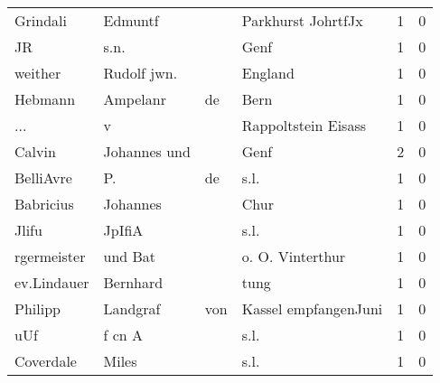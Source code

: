 \documentclass[10pt,a4paper,landscape]{article}
\begin{document}
\begin{longtable}{llllrr}
                 Grindali &                            Edmuntf &             &                          Parkhurst JohrtfJx &          1 &         0 \\
                       JR &                               s.n. &             &                                        Genf &          1 &         0 \\
                  weither &                        Rudolf jwn. &             &                                     England &          1 &         0 \\
                  Hebmann &                           Ampelanr &          de &                                        Bern &          1 &         0 \\
                      ... &                                  v &             &                         Rappoltstein Eisass &          1 &         0 \\
                   Calvin &                       Johannes und &             &                                        Genf &          2 &         0 \\
                BelliAvre &                                 P. &          de &                                        s.l. &          1 &         0 \\
                Babricius &                           Johannes &             &                                        Chur &          1 &         0 \\
                    Jlifu &                             JpIfiA &             &                                        s.l. &          1 &         0 \\
              rgermeister &                            und Bat &             &                            o. O. Vinterthur &          1 &         0 \\
              ev.Lindauer &                           Bernhard &             &                                        tung &          1 &         0 \\
                  Philipp &                           Landgraf &         von &                        Kassel empfangenJuni &          1 &         0 \\
                      uUf &                             f cn A &             &                                        s.l. &          1 &         0 \\
                Coverdale &                              Miles &             &                                        s.l. &          1 &         0 \\

\end{longtable}
\end{document}
